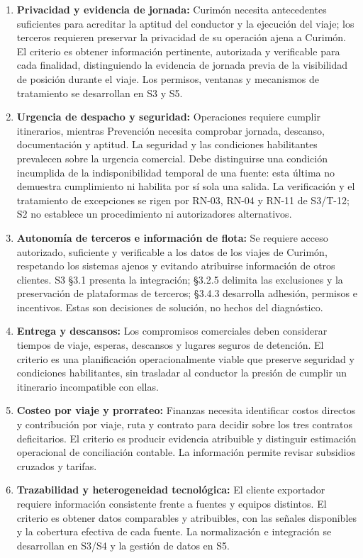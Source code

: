 \begin{enumerate}
  \item \textbf{Privacidad y evidencia de jornada:} Curimón necesita antecedentes suficientes para acreditar la aptitud del conductor y la ejecución del viaje; los terceros requieren preservar la privacidad de su operación ajena a Curimón. El criterio es obtener información pertinente, autorizada y verificable para cada finalidad, distinguiendo la evidencia de jornada previa de la visibilidad de posición durante el viaje. Los permisos, ventanas y mecanismos de tratamiento se desarrollan en S3 y S5.
  \item \textbf{Urgencia de despacho y seguridad:} Operaciones requiere cumplir itinerarios, mientras Prevención necesita comprobar jornada, descanso, documentación y aptitud. La seguridad y las condiciones habilitantes prevalecen sobre la urgencia comercial. Debe distinguirse una condición incumplida de la indisponibilidad temporal de una fuente: esta última no demuestra cumplimiento ni habilita por sí sola una salida. La verificación y el tratamiento de excepciones se rigen por RN-03, RN-04 y RN-11 de S3/T-12; S2 no establece un procedimiento ni autorizadores alternativos.
  \item \textbf{Autonomía de terceros e información de flota:} Se requiere acceso autorizado, suficiente y verificable a los datos de los viajes de Curimón, respetando los sistemas ajenos y evitando atribuirse información de otros clientes. S3 §3.1 presenta la integración; §3.2.5 delimita las exclusiones y la preservación de plataformas de terceros; §3.4.3 desarrolla adhesión, permisos e incentivos. Estas son decisiones de solución, no hechos del diagnóstico.
  \item \textbf{Entrega y descansos:} Los compromisos comerciales deben considerar tiempos de viaje, esperas, descansos y lugares seguros de detención. El criterio es una planificación operacionalmente viable que preserve seguridad y condiciones habilitantes, sin trasladar al conductor la presión de cumplir un itinerario incompatible con ellas.
  \item \textbf{Costeo por viaje y prorrateo:} Finanzas necesita identificar costos directos y contribución por viaje, ruta y contrato para decidir sobre los tres contratos deficitarios. El criterio es producir evidencia atribuible y distinguir estimación operacional de conciliación contable. La información permite revisar subsidios cruzados y tarifas.
  \item \textbf{Trazabilidad y heterogeneidad tecnológica:} El cliente exportador requiere información consistente frente a fuentes y equipos distintos. El criterio es obtener datos comparables y atribuibles, con las señales disponibles y la cobertura efectiva de cada fuente. La normalización e integración se desarrollan en S3/S4 y la gestión de datos en S5.
\end{enumerate}


